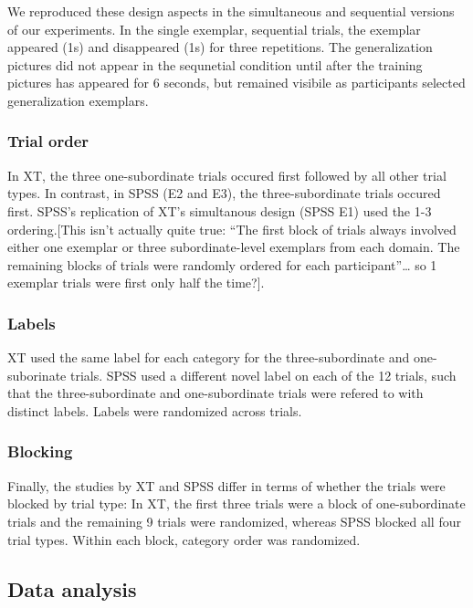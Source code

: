 \documentclass[english,floatsintext,man]{apa6}
\theoremstyle{definition}
\theoremstyle{definition}
\theoremstyle{remark}
\begin{document}
We reproduced these design aspects in the simultaneous and sequential
versions of our experiments. In the single exemplar, sequential trials,
the exemplar appeared (1s) and disappeared (1s) for three repetitions.
The generalization pictures did not appear in the sequnetial condition
until after the training pictures has appeared for 6 seconds, but
remained visibile as participants selected generalization exemplars.

\subsubsection{Trial order}\label{trial-order}

In XT, the three one-subordinate trials occured first followed by all
other trial types. In contrast, in SPSS (E2 and E3), the
three-subordinate trials occured first. SPSS's replication of XT's
simultanous design (SPSS E1) used the 1-3 ordering.{[}This isn't
actually quite true: \enquote{The first block of trials always involved
either one exemplar or three subordinate-level exemplars from each
domain. The remaining blocks of trials were randomly ordered for each
participant}\ldots{} so 1 exemplar trials were first only half the
time?{]}.

\subsubsection{Labels}\label{labels}

XT used the same label for each category for the three-subordinate and
one-suborinate trials. SPSS used a different novel label on each of the
12 trials, such that the three-subordinate and one-subordinate trials
were refered to with distinct labels. Labels were randomized across
trials.

\subsubsection{Blocking}\label{blocking}

Finally, the studies by XT and SPSS differ in terms of whether the
trials were blocked by trial type: In XT, the first three trials were a
block of one-subordinate trials and the remaining 9 trials were
randomized, whereas SPSS blocked all four trial types. Within each
block, category order was randomized.

\subsection{Data analysis}\label{data-analysis}
\end{document}
